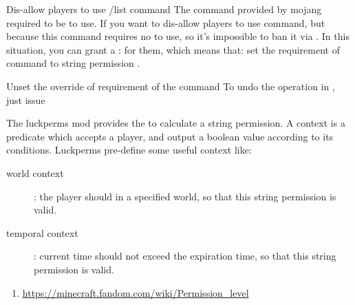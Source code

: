 \begin{example}{Dis-allow players to use /list command}
    The command  provided by mojang required  to be  to use.
    If you want to dis-allow players to use  command, but because this command requires no  to use, so it's impossible to ban it via .
    In this situation, you can grant a :  for them, which means that: set the requirement of command  to string permission .
\end{example}

\begin {example}{Unset the override of requirement of the command}
    To undo the operation in , just issue 
\end{example}

The luckperms mod provides the  to calculate a string permission.
A context is a predicate which accepts a player, and output a boolean value according to its conditions.
Luckperms pre-define some useful context like:
\begin{description}
    \item[world context]: the player should in a specified world, so that this string permission is valid.
    \item[temporal context]: current time should not exceed the expiration time, so that this string permission is valid.
\end{description}


\begin{enumerate}
    \item \url{https://minecraft.fandom.com/wiki/Permission\_level}
\end{enumerate}
